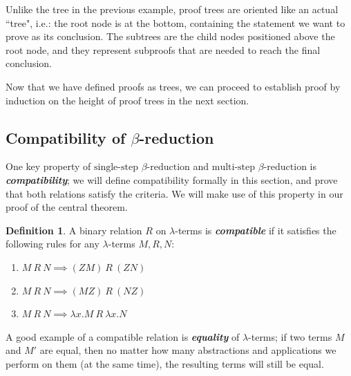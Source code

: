 \documentclass[a4paper,11pt]{article}
\theoremstyle{definition}
\newtheorem{definition}{Definition}[section]
\theoremstyle{example}
\theoremstyle{lemma}
\newcommand{\lamterm}[2]{\lambda #1. #2}
\newcommand{\tssbr}{\text{single-step $\beta$-reduction}}
\newcommand{\tmsbr}{\text{multi-step $\beta$-reduction}}
\begin{document}
Unlike the tree in the previous example, proof trees are oriented like an actual ``tree", i.e.: the root node is at the bottom, containing the statement we want to prove as its conclusion. The subtrees are the child nodes positioned above the root node, and they represent subproofs that are needed to reach the final conclusion.

Now that we have defined proofs as trees, we can proceed to establish proof by induction on the height of proof trees in the next section.

\subsection{Compatibility of $\beta$-reduction}
One key property of $\tssbr$ and $\tmsbr$ is \textbf{\textit{compatibility}}; we will define compatibility formally in this section, and prove that both relations satisfy the criteria. We will make use of this property in our proof of the central theorem.

\begin{definition}
A binary relation $R$ on $\lambda$-terms is \textit{\textbf{compatible}} if it satisfies the following rules for any $\lambda$-terms $M, R, N$:
\begin{enumerate}[topsep=2pt,itemsep=-0.5ex,partopsep=1ex,parsep=1ex]
    \item $M\ R\ N \implies (ZM)\ R\ (ZN)$
    \item $M\ R\ N \implies (MZ)\ R\ (NZ)$
    \item $M\ R\ N \implies \lamterm{x}{M}\ R\ \lamterm{x}{N}$
\end{enumerate}
\end{definition}

A good example of a compatible relation is \textit{\textbf{equality}} of $\lambda$-terms; if two terms $M$ and $M'$ are equal, then no matter how many abstractions and applications we perform on them (at the same time), the resulting terms will still be equal. 
\end{document}
